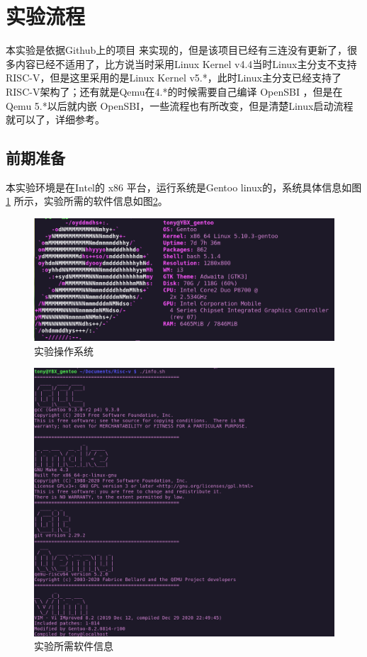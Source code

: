 \section{实验流程}
本实验是依据Github上的项目 \cite{BusyBear} 来实现的，但是该项目已经有三连没有更新了，很多内容已经不适用了，比方说当时采用Linux Kernel v4.4当时Linux主分支不支持RISC-V，但是这里采用的是Linux Kernel v5.*，此时Linux主分支已经支持了RISC-V架构了；还有就是Qemu在4.*的时候需要自己编译 OpenSBI ，但是在Qemu 5.*以后就内嵌 OpenSBI，一些流程也有所改变，但是清楚Linux启动流程就可以了，详细参考\cite{从按下电源开始的一场接力赛}。

\subsection{前期准备}
本实验环境是在Intel的 x86 平台，运行系统是Gentoo linux的，系统具体信息如图\ref{fig:gentoo} 所示，实验所需的软件信息如图\ref{fig:info}。

\begin{figure}[htbp]
  \centering %
  \includegraphics[width=0.8 \textwidth]{figs/Process/gentoo_Logo.eps}
  \caption{实验操作系统}
  \label{fig:gentoo} %
\end{figure}

\begin{figure}[htbp]
  \centering %
  \includegraphics[width=1.0 \textwidth]{figs/Process/info.png}
  \caption{实验所需软件信息}
  \label{fig:info} %
\end{figure}

